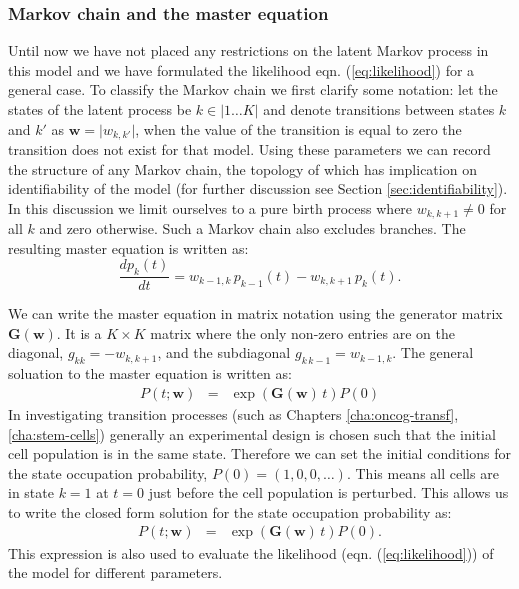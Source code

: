 \subsubsection{Markov chain and the master equation}
\label{sec:markov-chain-master}

Until now we have not placed any restrictions on the latent Markov process in this model and we have formulated the
likelihood eqn. (\ref{eq:likelihood}) for a general case. To classify the Markov chain we first clarify some notation: let the states of the latent process be $k \in \lvert 1 \ldots K \rvert$ and denote transitions between states $k$ and $k'$ as $\mathbf{w} = \lvert w_{k,k'} \rvert$, when the value of the transition is equal to zero the transition does not exist for that model. Using these parameters we can record the structure of any Markov chain, the topology of which has implication on identifiability of the model (for further discussion see Section \ref{sec:identifiability}). In this discussion we limit ourselves to a pure birth process where $w_{k,k+1} \ne 0$ for all $k$ and zero otherwise. Such a Markov chain also excludes branches. The resulting master equation is written as:
\begin{equation}
  \label{eq:master}
  \frac{d p_k(t)}{dt} = w_{k-1,k}\, p_{k-1}(t) - w_{k,k+1}\, p_k(t).
\end{equation}

We can write the master equation in matrix notation using the generator matrix $\mathbf{G}(\mathbf{w})$. It is a $K \times K$ matrix where the only non-zero entries are on the diagonal, $g_{kk}=-w_{k,k+1}$, and the subdiagonal $ g_{k\,k-1}=w_{k-1,k}$. The general soluation to the master equation is written as:
\begin{eqnarray}
  \label{eq:masterMat}
  P(t; \mathbf{w}) &=& \exp{\left(\mathbf{G}(\mathbf{w})\,t \right) } {P}(0)
\end{eqnarray} 
In investigating transition processes (such as Chapters \ref{cha:oncog-transf}, \ref{cha:stem-cells}) generally an experimental design is chosen such that the initial cell population is in the same state. Therefore we can set the initial conditions for the state occupation probability, $P(0) = (1, 0 , 0, \ldots)$. This means all cells are in state $k=1$ at $t=0$ just before the cell population is perturbed. This allows us to write the closed form solution for the state occupation probability as:
\begin{eqnarray}
  \label{eq:state-occ}
  P(t; \mathbf{w}) &= & \exp{\left(\mathbf{G}(\mathbf{w})\,t \right) } {P}(0).
\end{eqnarray}
This expression is also used to evaluate the likelihood (eqn. (\ref{eq:likelihood})) of the model for different parameters.

